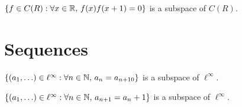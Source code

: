 \documentclass{homework}
\begin{document}
\begin{truefalse}
  $\{ f \in C(R) : \forall x \in \mathbb{R},\, f(x) f(x+1) = 0 \}$ is a subspace of $C(R)$.
\end{truefalse}

\section{Sequences}

\begin{truefalse}
  $\{ (a_1,\ldots) \in \ell^\infty : \forall n \in \mathbb{N},\, a_n = a_{n+10} \}$ is a subspace of $\ell^\infty$.
\end{truefalse}

\begin{truefalse}
  $\{ (a_1,\ldots) \in \ell^\infty : \forall n \in \mathbb{N},\, a_{n+1} = a_{n} + 1 \}$ is a subspace of $\ell^\infty$.
\end{truefalse}
\end{document}
